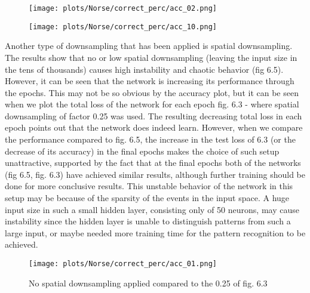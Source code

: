 \documentclass[12pt]{report}
\begin{document}
\begin{figure}
\centering
\begin{minipage}{.4\textwidth}
  \centering
  \texttt{[image: plots/Norse/correct\_perc/acc\_02.png]}
  \label{fig:test1}
\end{minipage}
\begin{minipage}{.4\textwidth}
  \centering
  \texttt{[image: plots/Norse/correct\_perc/acc\_10.png]}
  \label{fig:test2}
\end{minipage}
\end{figure}

Another type of downsampling that has been applied is spatial downsampling. The results show that no or low spatial downsampling (leaving the input size in the tens of thousands) causes high instability and chaotic behavior (fig 6.5). However, it can be seen that the network is increasing its performance through the epochs. This may not be so obvious by the accuracy plot, but it can be seen when we plot the total loss of the network for each epoch fig. 6.3 - where spatial downsampling of factor 0.25 was used. The resulting decreasing total loss in each epoch points out that the network does indeed learn. However, when we compare the performance compared to fig. 6.5, the increase in the test loss of 6.3 (or the decrease of its accuracy) in the final epochs makes the choice of such setup unattractive, supported by the fact that at the final epochs both of the networks (fig 6.5, fig. 6.3) have achieved similar results, although further training should be done for more conclusive results. This unstable behavior of the network in this setup may be because of the sparsity of the events in the input space. A huge input size in such a small hidden layer, consisting only of 50 neurons, may cause instability since the hidden layer is unable to distinguish patterns from such a large input, or maybe needed more training time for the pattern recognition to be achieved.

\begin{figure}[htp] %
    \centering
     \texttt{[image: plots/Norse/correct\_perc/acc\_01.png]}
    \caption{No spatial downsampling applied compared to the 0.25 of fig. 6.3}
    \label{fig:representation-methods}
\end{figure}
\end{document}
